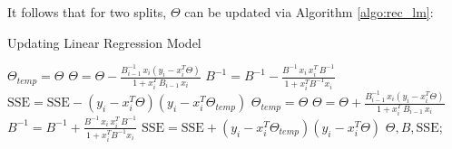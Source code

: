 \documentclass[a4paper, 11pt]{article}
\begin{document}
It follows that for two splits, $\Theta$ can be updated via Algorithm \ref{algo:rec_lm}:
\begin{algorithm}
 \caption{Updating Linear Regression Model \label{algo:rec_lm}}
 \begin{algorithmic}[1]
 \renewcommand{\algorithmicrequire}{\textbf{Input}: $\Theta, B, \text{SSE}, \mathcal{D}_0, \mathcal{D}_1$}
 \renewcommand{\algorithmicensure}{\textbf{Output}: $\Theta_{updated}, \text{B}_{updated}, \text{SSE}_{updated}$}
 \REQUIRE
 \ENSURE
    \STATE
    $\Theta_{temp} = \Theta$
    \STATE
    $\Theta = \Theta - \frac{B^{-1}_{i-1} \, x_i \left(y_i - x_i^T\Theta\right)}{1 + x_i^T \, B_{i-1} \, x_i}$
    \STATE
    $B^{-1} = B^{-1} - \frac{B^{-1} \, x_i \, x_i^T \, B^{-1}}{1 + x_i^T B^{-1} x_i}$
    \STATE
    $\text{SSE} = \text{SSE} - \left(y_i - x_i^T \Theta\right) \left(y_i - x_i^T \Theta_{temp}\right)$
 \ENDFOR 
    \STATE
    $\Theta_{temp} = \Theta$
    \STATE
    $\Theta = \Theta + \frac{B^{-1}_{i-1} \, x_i \left(y_i - x_i^T\Theta\right)}{1 + x_i^T \, B_{i-1} \, x_i}$
    \STATE
    $B^{-1} = B^{-1} + \frac{B^{-1} \, x_i \, x_i^T \, B^{-1}}{1 + x_i^T B^{-1} x_i}$
    \STATE
    $\text{SSE} = \text{SSE} + \left(y_i - x_i^T \Theta_{temp}\right) \left(y_i - x_i^T \Theta\right)$
 \ENDFOR
 \RETURN $\Theta, B, \text{SSE}$;
 \end{algorithmic} 
\end{algorithm}





\end{document}
